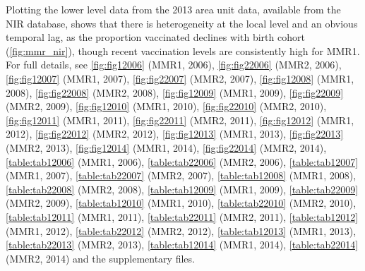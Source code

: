 \documentclass{article}
\begin{document}
Plotting the lower level data from the 2013 area unit data, available from the NIR database, shows that there is heterogeneity at the local level and an obvious temporal lag, as the proportion vaccinated declines with birth cohort (\autoref{fig:mmr_nir}), though recent vaccination levels are consistently high for MMR1. For full details, see \autoref{fig:fig12006} (MMR1, 2006), \autoref{fig:fig22006} (MMR2, 2006), \autoref{fig:fig12007} (MMR1, 2007), \autoref{fig:fig22007} (MMR2, 2007), \autoref{fig:fig12008} (MMR1, 2008), \autoref{fig:fig22008} (MMR2, 2008), \autoref{fig:fig12009} (MMR1, 2009), \autoref{fig:fig22009} (MMR2, 2009), \autoref{fig:fig12010} (MMR1, 2010), \autoref{fig:fig22010} (MMR2, 2010), \autoref{fig:fig12011} (MMR1, 2011), \autoref{fig:fig22011} (MMR2, 2011), \autoref{fig:fig12012} (MMR1, 2012), \autoref{fig:fig22012} (MMR2, 2012), \autoref{fig:fig12013} (MMR1, 2013), \autoref{fig:fig22013} (MMR2, 2013), \autoref{fig:fig12014} (MMR1, 2014), \autoref{fig:fig22014} (MMR2, 2014), \autoref{table:tab12006} (MMR1, 2006), \autoref{table:tab22006} (MMR2, 2006), \autoref{table:tab12007} (MMR1, 2007), \autoref{table:tab22007} (MMR2, 2007), \autoref{table:tab12008} (MMR1, 2008), \autoref{table:tab22008} (MMR2, 2008), \autoref{table:tab12009} (MMR1, 2009), \autoref{table:tab22009} (MMR2, 2009), \autoref{table:tab12010} (MMR1, 2010), \autoref{table:tab22010} (MMR2, 2010), \autoref{table:tab12011} (MMR1, 2011), \autoref{table:tab22011} (MMR2, 2011), \autoref{table:tab12012} (MMR1, 2012), \autoref{table:tab22012} (MMR2, 2012), \autoref{table:tab12013} (MMR1, 2013), \autoref{table:tab22013} (MMR2, 2013), \autoref{table:tab12014} (MMR1, 2014), \autoref{table:tab22014} (MMR2, 2014) and the supplementary files.
\end{document}
